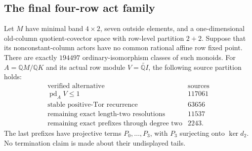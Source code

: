 \subsection{The final four-row act family}

\begin{lemma}
\label{C:four-row-seven-outside-two-plus-two-sources}
Let $M$ have minimal band $4\times2$, seven outside elements, and
a one-dimensional old-column quotient-covector space with row-level
partition $2+2$.  Suppose that its nonconstant-column actors have
no common rational affine row fixed point.  There are exactly
$194497$ ordinary-isomorphism classes of such monoids.
For $A=\mathbb QM/\mathbb QK$ and its actual row module
$V=\widetilde{\mathbb QI}$, the following source partition holds:
\[
\begin{array}{c|r}
\text{verified alternative}&\text{sources}\\\hline
\operatorname{pd}_A V\leq1&117061\\
\text{stable positive-Tor recurrence}&63656\\
\text{remaining exact length-two resolutions}&11537\\
\text{remaining exact prefixes through degree two}&2243.
\end{array}
\]
The last prefixes have projective terms $P_0,\ldots,P_3$, with
$P_3$ surjecting onto $\ker d_2$.  No termination claim is made
about their undisplayed tails.
\end{lemma}
